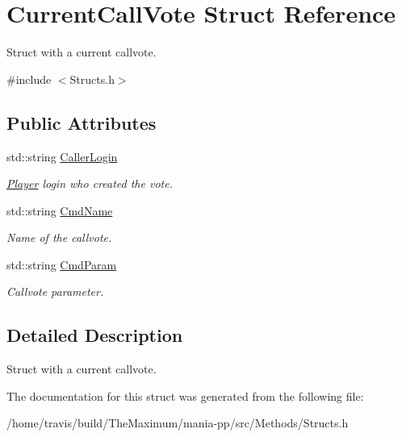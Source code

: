 \hypertarget{structCurrentCallVote}{\section{Current\-Call\-Vote Struct Reference}
\label{structCurrentCallVote}
}


Struct with a current callvote.  




{\ttfamily \#include $<$Structs.\-h$>$}

\subsection*{Public Attributes}
\begin{DoxyCompactItemize}
\item 
\hypertarget{structCurrentCallVote_a113ae06f4c42a20fa09107d480579379}{std\-::string \hyperlink{structCurrentCallVote_a113ae06f4c42a20fa09107d480579379}{Caller\-Login}}\label{structCurrentCallVote_a113ae06f4c42a20fa09107d480579379}

\begin{DoxyCompactList}\small\item\em \hyperlink{structPlayer}{Player} login who created the vote. \end{DoxyCompactList}\item 
\hypertarget{structCurrentCallVote_aaac826ac8fa0865cb90fd60aa26bb6a9}{std\-::string \hyperlink{structCurrentCallVote_aaac826ac8fa0865cb90fd60aa26bb6a9}{Cmd\-Name}}\label{structCurrentCallVote_aaac826ac8fa0865cb90fd60aa26bb6a9}

\begin{DoxyCompactList}\small\item\em Name of the callvote. \end{DoxyCompactList}\item 
\hypertarget{structCurrentCallVote_a69b91397ee1a0d237db24985c2d2b7ad}{std\-::string \hyperlink{structCurrentCallVote_a69b91397ee1a0d237db24985c2d2b7ad}{Cmd\-Param}}\label{structCurrentCallVote_a69b91397ee1a0d237db24985c2d2b7ad}

\begin{DoxyCompactList}\small\item\em Callvote parameter. \end{DoxyCompactList}\end{DoxyCompactItemize}


\subsection{Detailed Description}
Struct with a current callvote. 

The documentation for this struct was generated from the following file\-:\begin{DoxyCompactItemize}
\item 
/home/travis/build/\-The\-Maximum/mania-\/pp/src/\-Methods/Structs.\-h\end{DoxyCompactItemize}
